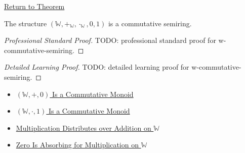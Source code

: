\newpage
{}
\label{prf:w-commutative-semiring}

\begin{remark*}[Return]
\hyperref[thm:w-commutative-semiring]{Return to Theorem}
\end{remark*}

\begin{theorem*}
The structure
$(\mathbb{W},+_{\mathbb{W}},\cdot_{\mathbb{W}},0,1)$ is a commutative
semiring.
\end{theorem*}

\begin{proof}[Professional Standard Proof]
\LRAProofBodyStart
TODO: professional standard proof for w-commutative-semiring.
\end{proof}

\begin{proof}[Detailed Learning Proof]
\LRAProofBodyStart
TODO: detailed learning proof for w-commutative-semiring.
\end{proof}

\begin{remark*}
\end{remark*}

\begin{dependencies}
\begin{itemize}
  \item \hyperref[thm:w-additive-commutative-monoid]{$(\mathbb{W},+,0)$ Is a Commutative Monoid}
  \item \hyperref[thm:w-multiplicative-commutative-monoid]{$(\mathbb{W},\cdot,1)$ Is a Commutative Monoid}
  \item \hyperref[thm:multiplication-distributes-over-addition-on-w]{Multiplication Distributes over Addition on $\mathbb{W}$}
  \item \hyperref[thm:zero-absorbing-for-multiplication-on-w]{Zero Is Absorbing for Multiplication on $\mathbb{W}$}
\end{itemize}
\end{dependencies}

\clearpage
